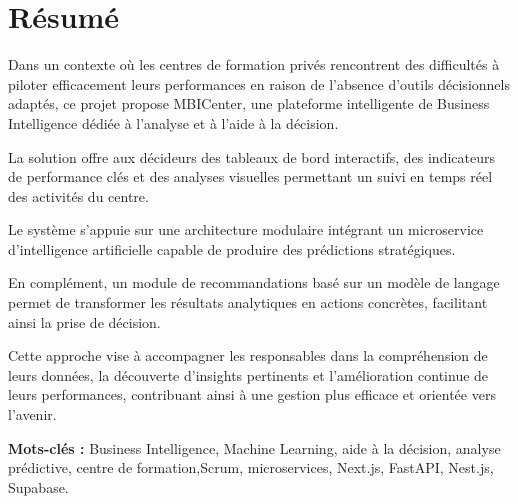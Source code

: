 \chapter*{Résumé} 
Dans un contexte où les centres de formation privés rencontrent des difficultés à piloter efficacement leurs performances en raison de l’absence d’outils décisionnels adaptés, ce projet propose MBICenter, une plateforme intelligente de Business Intelligence dédiée à l’analyse et à l’aide à la décision.

La solution offre aux décideurs des tableaux de bord interactifs, des indicateurs de performance clés et des analyses visuelles permettant un suivi en temps réel des activités du centre.

Le système s’appuie sur une architecture modulaire intégrant un microservice d’intelligence artificielle capable de produire des prédictions stratégiques.

En complément, un module de recommandations basé sur un modèle de langage permet de transformer les résultats analytiques en actions concrètes, facilitant ainsi la prise de décision.

Cette approche vise à accompagner les responsables dans la compréhension de leurs données, la découverte d’insights pertinents et l’amélioration continue de leurs performances, contribuant ainsi à une gestion plus efficace et orientée vers l’avenir.

\vspace{1cm}
\textbf{Mots-clés :} Business Intelligence, Machine Learning, aide à la décision, analyse prédictive, centre de formation,Scrum, microservices, Next.js, FastAPI, Nest.js, Supabase.